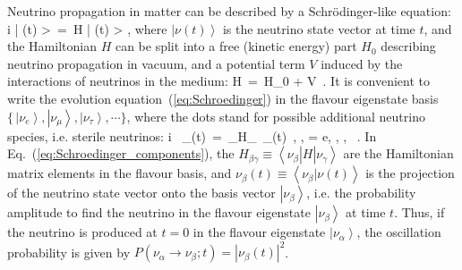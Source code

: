 Neutrino propagation in matter can be described by a Schr\"odinger-like equation:
%
\be
  i  \left| \nu(t) \right>\, =\, H \left| \nu(t) \right> ,
\label{eq:Schroedinger}
\eeq
%
where $\left| \nu(t) \right>$ is the neutrino state vector at time $t$, and the Hamiltonian $H$
can be split into a free (kinetic energy) part $H_0$ describing neutrino propagation in vacuum,
and a potential term $V$ induced by the interactions of neutrinos in the medium:
%
\be
  H\, =\, H_0 + V\, .
\eeq
%
It is convenient to write the evolution equation~(\ref{eq:Schroedinger}) in
the flavour eigenstate basis $\{\, \left| \nu_e \right>, \left| \nu_\mu \right>, \left| \nu_\tau \right>, \cdots \}$,
where the dots stand for possible additional neutrino species, i.e. sterile neutrinos:
%
\be
  i \, \nu_\beta(t)\, =\, \sum_\gamma H_{\beta \gamma}\, \nu_\gamma(t)\, , \qquad \qquad
    \beta, \gamma = e, \mu, \tau, \cdots\ .
\label{eq:Schroedinger_components}
\eeq
%
In Eq.~(\ref{eq:Schroedinger_components}),
the $H_{\beta \gamma} \equiv \left< \nu_\beta \right| H \left| \nu_\gamma \right>$ are
the Hamiltonian matrix elements in the flavour basis,
and $\nu_\beta(t) \equiv \left< \nu_\beta | \nu(t) \right>$ %
is the projection of the neutrino state vector onto the basis vector $\left| \nu_\beta \right>$,
i.e. the probability amplitude to find
the neutrino in the flavour eigenstate $\left| \nu_\beta \right>$ at time $t$.
Thus, if the neutrino is produced at $t=0$ in the flavour eigenstate $\left| \nu_\alpha \right>$,
the oscillation probability
is given by $P(\nu_\alpha \to \nu_\beta; t) = |\nu_\beta(t)|^2$.

